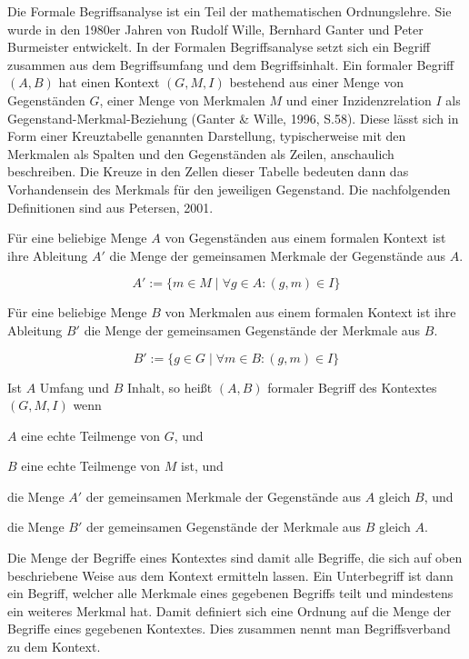 \documentclass[pagesize,paper=A4,DIV=calc,fontsize=12pt,draft=false]{scrreprt}
\begin{document}
Die Formale Begriffsanalyse ist ein Teil der mathematischen Ordnungslehre. 
Sie wurde in den 1980er Jahren von Rudolf Wille, Bernhard Ganter und Peter Burmeister entwickelt. 
In der Formalen Begriffsanalyse setzt sich ein Begriff zusammen aus dem Begriffsumfang und dem Begriffsinhalt. 
Ein formaler Begriff $(A,B)$ hat einen Kontext $(G,M,I)$ bestehend aus einer Menge von Gegenständen $G$, einer Menge von Merkmalen $M$ und einer Inzidenzrelation $I$ als Gegenstand-Merkmal-Beziehung (Ganter \& Wille, 1996, S.58). 
Diese lässt sich in Form einer Kreuztabelle genannten Darstellung, typischerweise mit den Merkmalen als Spalten und den Gegenständen als Zeilen, anschaulich beschreiben. 
Die Kreuze in den Zellen dieser Tabelle bedeuten dann das Vorhandensein des Merkmals für den jeweiligen Gegenstand.
Die nachfolgenden Definitionen sind aus Petersen, 2001. 

Für eine beliebige Menge $A$ von Gegenständen aus einem formalen Kontext ist ihre Ableitung $A'$ die Menge der gemeinsamen Merkmale der Gegenstände aus $A$. 

\begin{equation*}
A' := \lbrace m \in M \; \vert \; \forall g \in A: (g,m) \in I\rbrace
\end{equation*}

Für eine beliebige Menge $B$ von Merkmalen aus einem formalen Kontext ist ihre Ableitung $B'$ die Menge der gemeinsamen Gegenstände der Merkmale aus $B$. 

\begin{equation*}
B' := \lbrace g \in G \; \vert \; \forall m \in B: (g,m) \in I\rbrace
\end{equation*}

Ist $A$ Umfang und $B$ Inhalt, so heißt $(A,B)$ formaler Begriff des Kontextes $(G,M,I)$ wenn

\begin{inparaenum}
\item
 $A$ eine echte Teilmenge von $G$, und
\item
 $B$ eine echte Teilmenge von $M$ ist, und
\item
 die Menge $A'$ der gemeinsamen Merkmale der Gegenstände aus $A$ gleich
 $B$, und
\item
 die Menge $B'$ der gemeinsamen Gegenstände der Merkmale aus $B$ gleich
 $A$.
\end{inparaenum}

Die Menge der Begriffe eines Kontextes sind damit alle Begriffe, die sich auf oben beschriebene Weise aus dem Kontext ermitteln lassen. 
Ein Unterbegriff ist dann ein Begriff, welcher alle Merkmale eines gegebenen Begriffs teilt und mindestens ein weiteres Merkmal hat. 
Damit definiert sich eine Ordnung auf die Menge der Begriffe eines gegebenen Kontextes. 
Dies zusammen nennt man Begriffsverband zu dem Kontext. 
\end{document}
